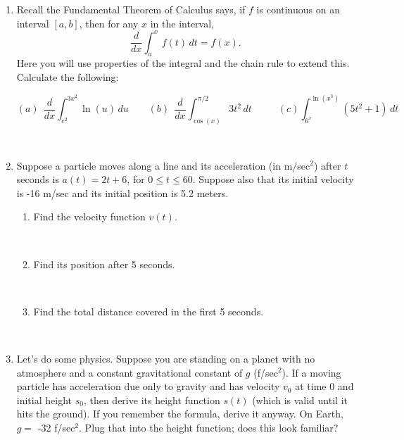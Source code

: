 \documentclass[11pt, oneside]{article}   	%
\title{}
\author{Week 3 discussion problems}
\date{}							%
\begin{document}
\maketitle

\begin{enumerate}

\item

Recall the Fundamental Theorem of Calculus says, if $f$ is continuous on an interval $[a,b]$, then for any $x$ in the interval,
$$\dfrac{d}{dx} \int_a^x \, f(t) \, dt  = f(x).$$ Here you will use properties of the integral and the chain rule to extend this. Calculate the following:


$$  (a) \ \ \dfrac{d}{dx} \int_{e^2}^{3x^2}  \ln(u) \, du \ \ \ \ \ \ \ \ \ (b) \ \ \dfrac{d}{dx} \int_{\cos(x)}^{\pi/2} 3t^2 \, dt \ \ \ \ \ \ 
 \ \ \ \ \ \ (c)  \int_{6^x}^{\ln(x^3)}\left( 5t^2+1 \right) \, dt $$
 
 
\

\item 


Suppose a particle moves along a line and its acceleration (in m/sec$^2$) after $t$ seconds is $a(t)=2t+6$, for $0 \le t \le 60$. Suppose also that its initial velocity is -16 m/sec and its initial position is 5.2 meters.

\begin{enumerate}
\item Find the velocity function $v(t)$.

\

\item Find its position after 5 seconds.

\

\item Find the total distance covered in the first 5 seconds.
\end{enumerate}

\

\item Let's do some physics. Suppose you are standing on a planet with no atmosphere and a constant gravitational constant of $g$ (f/sec$^2$). If a moving particle has acceleration due only to gravity and has velocity $v_0$ at time $0$ and initial height $s_0$, then derive its height function $s(t)$ (which is valid until it hits the ground). If you remember the formula, derive it anyway. On Earth, $g=$ -32 f/sec$^2$. Plug that into the height function; does this look familiar?

\end{enumerate}
\end{document}
